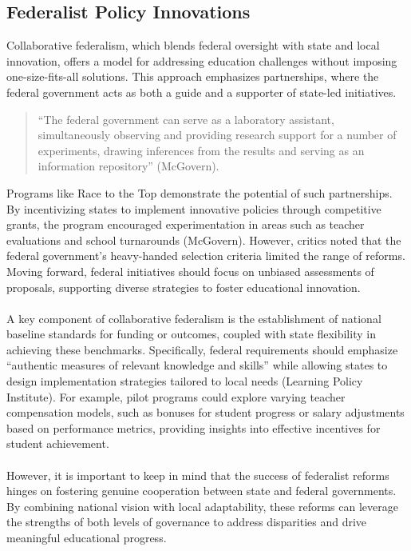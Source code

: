 \documentclass[11pt]{extarticle}
\begin{document}
\subsection{Federalist Policy Innovations}
Collaborative federalism, which blends federal oversight with state and local innovation, offers a model for addressing education challenges without imposing one-size-fits-all solutions. This approach emphasizes partnerships, where the federal government acts as both a guide and a supporter of state-led initiatives. 
\begin{quote}
  ``The federal government can serve as a laboratory assistant, simultaneously observing and providing research support for a number of experiments, drawing inferences from the results and serving as an information repository” (McGovern).
\end{quote}
Programs like Race to the Top demonstrate the potential of such partnerships. By incentivizing states to implement innovative policies through competitive grants, the program encouraged experimentation in areas such as teacher evaluations and school turnarounds (McGovern). However, critics noted that the federal government’s heavy-handed selection criteria limited the range of reforms. Moving forward, federal initiatives should focus on unbiased assessments of proposals, supporting diverse strategies to foster educational innovation.\\
\\
A key component of collaborative federalism is the establishment of national baseline standards for funding or outcomes, coupled with state flexibility in achieving these benchmarks. Specifically, federal requirements should emphasize ``authentic measures of relevant knowledge and skills” while allowing states to design implementation strategies tailored to local needs (Learning Policy Institute). For example, pilot programs could explore varying teacher compensation models, such as bonuses for student progress or salary adjustments based on performance metrics, providing insights into effective incentives for student achievement.\\
\\
However, it is important to keep in mind that the success of federalist reforms hinges on fostering genuine cooperation between state and federal governments. By combining national vision with local adaptability, these reforms can leverage the strengths of both levels of governance to address disparities and drive meaningful educational progress.
\end{document}
